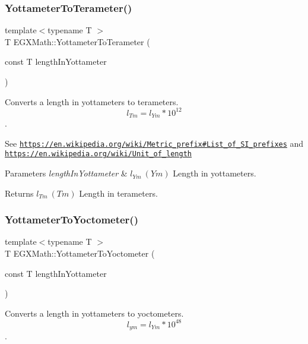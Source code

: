 \subsubsection{\texorpdfstring{Yottameter\+To\+Terameter()}{YottameterToTerameter()}}
{\footnotesize\ttfamily template$<$typename T $>$ \\
T E\+G\+X\+Math\+::\+Yottameter\+To\+Terameter (\begin{DoxyParamCaption}\item[{const T}]{length\+In\+Yottameter }\end{DoxyParamCaption})}



Converts a length in yottameters to terameters. \[ l_{Tm}=l_{Ym} * 10^{12} \]. 

See \href{https://en.wikipedia.org/wiki/Metric_prefix#List_of_SI_prefixes}{\tt https\+://en.\+wikipedia.\+org/wiki/\+Metric\+\_\+prefix\#\+List\+\_\+of\+\_\+\+S\+I\+\_\+prefixes} and \href{https://en.wikipedia.org/wiki/Unit_of_length}{\tt https\+://en.\+wikipedia.\+org/wiki/\+Unit\+\_\+of\+\_\+length} 
\begin{DoxyParams}{Parameters}
{\em length\+In\+Yottameter} & $ l_{Ym}\ (Ym)$ Length in yottameters. \\
\hline
\end{DoxyParams}
\begin{DoxyReturn}{Returns}
$ l_{Tm}\ (Tm)$ Length in terameters. 
\end{DoxyReturn}
\mbox{\label{group___e_g_x_math-_conversions-_length_conversions-_yottameter-_s_i_ga946a366f9c912aaa81ab052567f86bc2}} 
\subsubsection{\texorpdfstring{Yottameter\+To\+Yoctometer()}{YottameterToYoctometer()}}
{\footnotesize\ttfamily template$<$typename T $>$ \\
T E\+G\+X\+Math\+::\+Yottameter\+To\+Yoctometer (\begin{DoxyParamCaption}\item[{const T}]{length\+In\+Yottameter }\end{DoxyParamCaption})}



Converts a length in yottameters to yoctometers. \[ l_{ym}=l_{Ym} * 10^{48} \]. 

